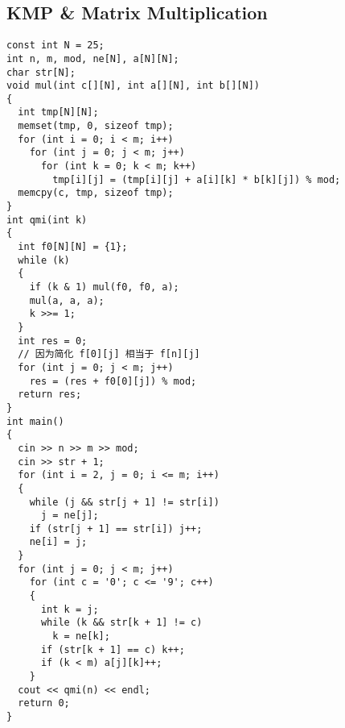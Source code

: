\subsection{KMP \& Matrix Multiplication}
\begin{lstlisting}
const int N = 25;
int n, m, mod, ne[N], a[N][N];
char str[N];
void mul(int c[][N], int a[][N], int b[][N])
{
  int tmp[N][N];
  memset(tmp, 0, sizeof tmp);
  for (int i = 0; i < m; i++)
    for (int j = 0; j < m; j++)
      for (int k = 0; k < m; k++)
        tmp[i][j] = (tmp[i][j] + a[i][k] * b[k][j]) % mod;
  memcpy(c, tmp, sizeof tmp);
}
int qmi(int k)
{
  int f0[N][N] = {1};
  while (k)
  {
    if (k & 1) mul(f0, f0, a);
    mul(a, a, a);
    k >>= 1;
  }
  int res = 0;
  // 因为简化 f[0][j] 相当于 f[n][j]
  for (int j = 0; j < m; j++)
    res = (res + f0[0][j]) % mod;
  return res;
}
int main()
{
  cin >> n >> m >> mod;
  cin >> str + 1;
  for (int i = 2, j = 0; i <= m; i++)
  {
    while (j && str[j + 1] != str[i])
      j = ne[j];
    if (str[j + 1] == str[i]) j++;
    ne[i] = j;
  }
  for (int j = 0; j < m; j++)
    for (int c = '0'; c <= '9'; c++)
    {
      int k = j;
      while (k && str[k + 1] != c)
        k = ne[k];
      if (str[k + 1] == c) k++;
      if (k < m) a[j][k]++;
    }
  cout << qmi(n) << endl;
  return 0;
}
\end{lstlisting}